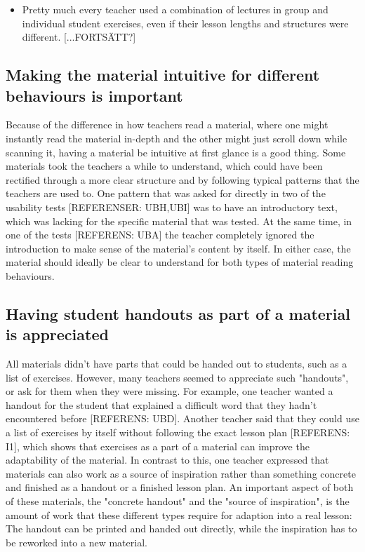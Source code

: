 \begin{itemize}
  \item Pretty much every teacher used a combination of lectures in group and individual student exercises, even if their lesson lengths and structures were different. [...FORTSÄTT?]
\end{itemize}

\subsection{Making the material intuitive for different behaviours is important}
Because of the difference in how teachers read a material, where one might instantly read the material in-depth and the other might just scroll down while scanning it, having a material be intuitive at first glance is a good thing. Some materials took the teachers a while to understand, which could have been rectified through a more clear structure and by following typical patterns that the teachers are used to. One pattern that was asked for directly in two of the usability tests [REFERENSER: UBH,UBI] was to have an introductory text, which was lacking for the specific material that was tested. At the same time, in one of the tests [REFERENS: UBA] the teacher completely ignored the introduction to make sense of the material's content by itself. In either case, the material should ideally be clear to understand for both types of material reading behaviours.

\subsection{Having student handouts as part of a material is appreciated}
All materials didn't have parts that could be handed out to students, such as a list of exercises. However, many teachers seemed to appreciate such "handouts", or ask for them when they were missing. For example, one teacher wanted a handout for the student that explained a difficult word that they hadn't encountered before [REFERENS: UBD]. Another teacher said that they could use a list of exercises by itself without following the exact lesson plan [REFERENS: I1], which shows that exercises as a part of a material can improve the adaptability of the material. In contrast to this, one teacher expressed that materials can also work as a source of inspiration rather than something concrete and finished as a handout or a finished lesson plan. An important aspect of both of these materials, the "concrete handout" and the "source of inspiration", is the amount of work that these different types require for adaption into a real lesson: The handout can be printed and handed out directly, while the inspiration has to be reworked into a new material.

